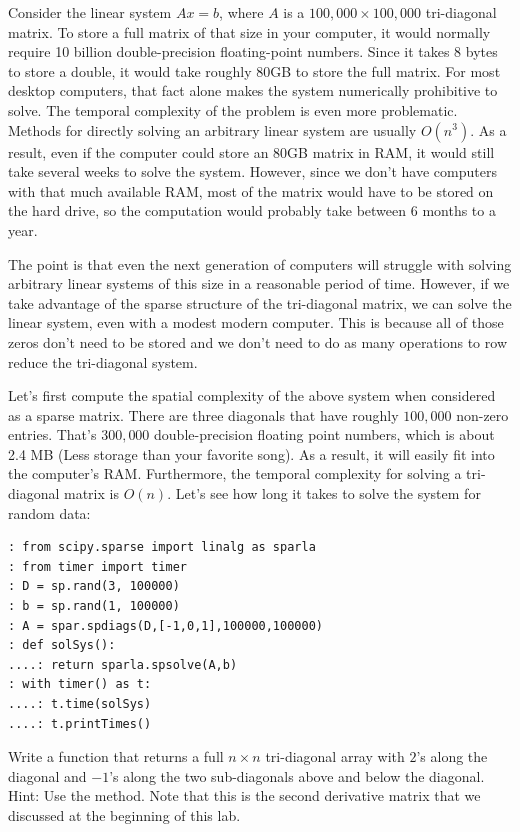 Consider the linear system $A x = b$, where $A$ is a
 $100,\!000\times 100,\!000$ tri-diagonal matrix.  To store a full
matrix of that size in your computer, it would normally require 10
billion double-precision floating-point numbers.  Since it takes 8
bytes to store a double, it would take roughly 80GB to store the
full matrix.  For most desktop computers, that fact alone makes the
system numerically prohibitive to solve. The temporal complexity of the problem is even more problematic. Methods for directly solving an arbitrary linear system are usually $O(n^3)$.  As
a result, even if the computer could store an 80GB matrix in RAM, it
would still take several weeks to solve the system.  However, since
we don't have computers with that much available RAM, most of the
matrix would have to be stored on the hard drive, so the computation
would probably take between $6$ months to a year.

The point is that even the next generation of computers will
struggle with solving arbitrary linear systems of this size in a
reasonable period of time.  However, if we take advantage of the
sparse structure of the tri-diagonal matrix, we can solve the linear
system, even with a modest modern computer.  This is because all of
those zeros don't need to be stored and we don't need to do as many
operations to row reduce the tri-diagonal system.

Let's first compute the spatial complexity of the above system when
considered as a sparse matrix.  There are three diagonals that have
roughly $100,\!000$ non-zero entries.  That's $300,\!000$
double-precision floating point numbers, which is about 2.4 MB (Less
storage than your favorite song).  As a result, it will easily
fit into the computer's RAM.  Furthermore, the temporal complexity for solving
a tri-diagonal matrix is $O(n)$. Let's see how long it takes to
solve the system for random data:

\begin{lstlisting}[style=python]
: from scipy.sparse import linalg as sparla
: from timer import timer
: D = sp.rand(3, 100000)
: b = sp.rand(1, 100000)
: A = spar.spdiags(D,[-1,0,1],100000,100000)
: def solSys():
....: return sparla.spsolve(A,b)
: with timer() as t:
....: t.time(solSys)
....: t.printTimes()
\end{lstlisting}

\begin{problem}
Write a function that returns a full $n\times n$
tri-diagonal array with $2$'s along the diagonal and $-1$'s along
the two sub-diagonals above and below the diagonal. Hint: Use the  method. Note that this is the second derivative matrix that we discussed at the beginning of this lab.
\end{problem}

